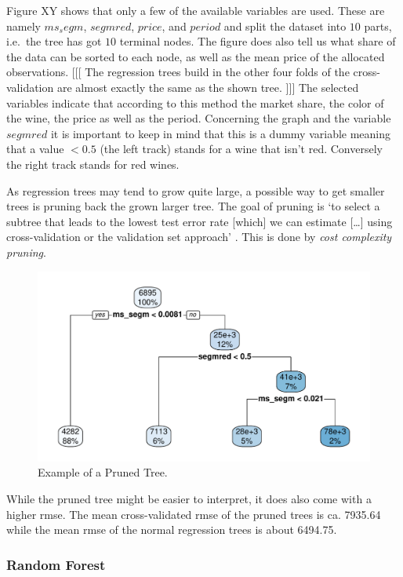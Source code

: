 \documentclass[11pt,]{article}
\begin{document}
Figure XY shows that only a few of the available variables are used.
These are namely \(ms_segm\), \(segmred\), \(price\), and \(period\) and
split the dataset into \(10\) parts, i.e.~the tree has got \(10\)
terminal nodes. The figure does also tell us what share of the data can
be sorted to each node, as well as the mean price of the allocated
observations. {[}{[}{[} The regression trees build in the other four
folds of the cross-validation are almost exactly the same as the shown
tree. {]}{]}{]} The selected variables indicate that according to this
method the market share, the color of the wine, the price as well as the
period. Concerning the graph and the variable \(segmred\) it is
important to keep in mind that this is a dummy variable meaning that a
value \(< 0.5\) (the left track) stands for a wine that isn't red.
Conversely the right track stands for red wines.

As regression trees may tend to grow quite large, a possible way to get
smaller trees is pruning back the grown larger tree. The goal of pruning
is `to select a subtree that leads to the lowest test error rate
{[}which{]} we can estimate {[}\ldots{]} using cross-validation or the
validation set approach' \autocite[p.~308]{James2014}. This is done by
\emph{cost complexity pruning}.

\begin{figure}
\centering
\includegraphics{../00_data/output_paper/09_tree_pruned.pdf}
\caption{Example of a Pruned Tree.}
\end{figure}

While the pruned tree might be easier to interpret, it does also come
with a higher rmse. The mean cross-validated rmse of the pruned trees is
ca. 7935.64 while the mean rmse of the normal regression trees is about
6494.75.

\hypertarget{random-forest}{%
\subsubsection{Random Forest}\label{random-forest}}
\end{document}
